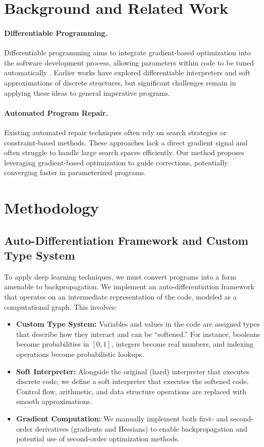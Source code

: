 \documentclass{article}
\begin{document}
\section{Background and Related Work}
\paragraph{Differentiable Programming.} Differentiable programming aims to integrate gradient-based optimization into the software development process, allowing parameters within code to be tuned automatically \cite{blondel2024elementsdifferentiableprogramming,DBLP:journals/corr/abs-1907-07587,vandemeulebroucke2018myia}. Earlier works have explored differentiable interpreters and soft approximations of discrete structures, but significant challenges remain in applying these ideas to general imperative programs.

\paragraph{Automated Program Repair.} Existing automated repair techniques often rely on search strategies or constraint-based methods. These approaches lack a direct gradient signal and often struggle to handle large search spaces efficiently. Our method proposes leveraging gradient-based optimization to guide corrections, potentially converging faster in parameterized programs.

\section{Methodology}

\subsection{Auto-Differentiation Framework and Custom Type System}
To apply deep learning techniques, we must convert programs into a form amenable to backpropagation. We implement an auto-differentiation framework that operates on an intermediate representation of the code, modeled as a computational graph. This involves:
\begin{itemize}
    \item \textbf{Custom Type System:} Variables and values in the code are assigned types that describe how they interact and can be ``softened.'' For instance, booleans become probabilities in $[0,1]$, integers become real numbers, and indexing operations become probabilistic lookups.
    \item \textbf{Soft Interpreter:} Alongside the original (hard) interpreter that executes discrete code, we define a soft interpreter that executes the softened code. Control flow, arithmetic, and data structure operations are replaced with smooth approximations.
    \item \textbf{Gradient Computation:} We manually implement both first- and second-order derivatives (gradients and Hessians) to enable backpropagation and potential use of second-order optimization methods.
\end{itemize}
\end{document}
